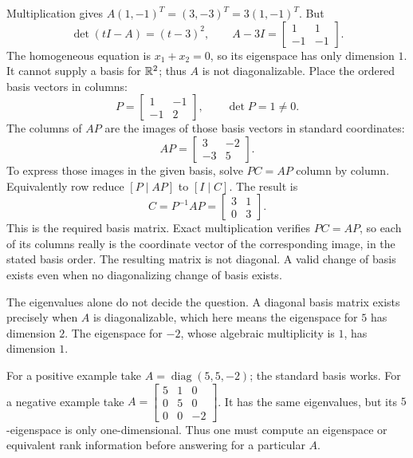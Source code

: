 Multiplication gives $A(1,-1)^T=(3,-3)^T=3(1,-1)^T$. But
\[
\det(tI-A)=(t-3)^2,\qquad
A-3I=\begin{bmatrix}1&1\\-1&-1\end{bmatrix}.
\]
The homogeneous equation is $x_1+x_2=0$, so its eigenspace has only dimension $1$. It cannot supply a basis for $\mathbb{R}^2$; thus $A$ is not diagonalizable.
Place the ordered basis vectors in columns:
\[P=\begin{bmatrix}1&-1\\-1&2\end{bmatrix},\qquad\det P=1\ne0.\]
The columns of $AP$ are the images of those basis vectors in standard coordinates:
\[AP=\begin{bmatrix}3&-2\\-3&5\end{bmatrix}.\]
To express those images in the given basis, solve $PC=AP$ column by column. Equivalently row reduce $[P\mid AP]$ to $[I\mid C]$. The result is
\[C=P^{-1}AP=\begin{bmatrix}3&1\\0&3\end{bmatrix}.\]
This is the required basis matrix. Exact multiplication verifies $PC=AP$, so each of its columns really is the coordinate vector of the corresponding image, in the stated basis order.
The resulting matrix is not diagonal. A valid change of basis exists even when no diagonalizing change of basis exists.

The eigenvalues alone do not decide the question. A diagonal basis matrix exists precisely when $A$ is diagonalizable, which here means the eigenspace for $5$ has dimension $2$. The eigenspace for $-2$, whose algebraic multiplicity is $1$, has dimension $1$.

For a positive example take $A=\operatorname{diag}(5,5,-2)$; the standard basis works. For a negative example take $A=\left[\begin{smallmatrix}5&1&0\\0&5&0\\0&0&-2\end{smallmatrix}\right]$. It has the same eigenvalues, but its $5$-eigenspace is only one-dimensional. Thus one must compute an eigenspace or equivalent rank information before answering for a particular $A$.


